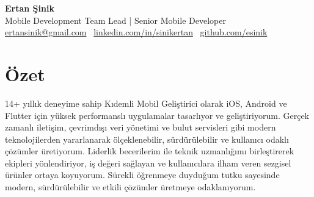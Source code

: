 \documentclass[10pt,a4paper]{extarticle}
\begin{document}
\begin{center}
    \begin{minipage}{\textwidth}
        \centering
        {\huge\textbf{Ertan Şinik}}\\[5pt]
		{\normalsize Mobile Development Team Lead | Senior Mobile Developer}\\[5pt]
        \href{mailto:ertansinik@gmail.com}{ertansinik@gmail.com} \textbullet\
        \href{https://linkedin.com/in/sinikertan}{linkedin.com/in/sinikertan} \textbullet\
        \href{https://github.com/esinik}{github.com/esinik}
    \end{minipage}
\end{center}
\section{Özet}
14+ yıllık deneyime sahip Kıdemli Mobil Geliştirici olarak iOS, Android ve Flutter için yüksek performanslı uygulamalar tasarlıyor ve geliştiriyorum. Gerçek zamanlı iletişim, çevrimdışı veri yönetimi ve bulut servisleri gibi modern teknolojilerden yararlanarak ölçeklenebilir, sürdürülebilir ve kullanıcı odaklı çözümler üretiyorum. Liderlik becerilerim ile teknik uzmanlığımı birleştirerek ekipleri yönlendiriyor, iş değeri sağlayan ve kullanıcılara ilham veren sezgisel ürünler ortaya koyuyorum. Sürekli öğrenmeye duyduğum tutku sayesinde modern, sürdürülebilir ve etkili çözümler üretmeye odaklanıyorum.
\end{document}
